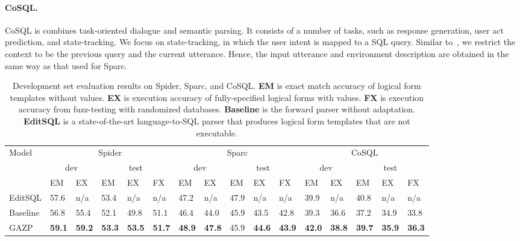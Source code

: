 \documentclass[11pt,a4paper]{article}
\begin{document}
\paragraph{CoSQL.}
CoSQL is combines task-oriented dialogue and semantic parsing.
It consists of a number of tasks, such as response generation, user act prediction, and state-tracking.
We focus on state-tracking, in which the user intent is mapped to a SQL query.
Similar to~\citet{zhang2019editing}, we restrict the context to be the previous query and the current utterance.
Hence, the input utterance and environment description are obtained in the same way as that used for Sparc.

\begin{table*}[t]
\centering
\addtolength{\tabcolsep}{-1.7pt}
\begin{tabular}{@{}llllllllllllllll@{}}
\toprule
\multirow{3}{*}{Model} & \multicolumn{5}{c}{Spider}       & \multicolumn{5}{c}{Sparc}        & \multicolumn{5}{c}{CoSQL}        \\ \cmidrule(l){2-6} \cmidrule(l){7-11} \cmidrule(l){12-16}
 & \multicolumn{2}{c}{dev} & \multicolumn{3}{c}{test} & \multicolumn{2}{c}{dev} & \multicolumn{3}{c}{test} & \multicolumn{2}{c}{dev} & \multicolumn{3}{c}{test} \\  \cmidrule(l){2-3} \cmidrule(l){4-6} \cmidrule(l){7-8} \cmidrule(l){9-11} \cmidrule(l){12-13} \cmidrule(l){14-16}
                       & EM   & EX   & EM   & EX   & FX   & EM   & EX   & EM   & EX   & FX   & EM   & EX   & EM   & EX   & FX   \\ \midrule
EditSQL                & 57.6 & n/a  & 53.4 & n/a  & n/a  & 47.2 & n/a  & 47.9 & n/a  & n/a  & 39.9 & n/a  & 40.8 & n/a  & n/a  \\ \midrule
Baseline               & 56.8 & 55.4 & 52.1 & 49.8 & 51.1 & 46.4 & 44.0 & 45.9 & 43.5 & 42.8 & 39.3 & 36.6 & 37.2 & 34.9 & 33.8 \\
GAZP                   & \textbf{59.1} & \textbf{59.2} & \textbf{53.3} & \textbf{53.5} & \textbf{51.7} & \textbf{48.9} & \textbf{47.8} & 45.9 & \textbf{44.6} & \textbf{43.9} & \textbf{42.0} & \textbf{38.8} & \textbf{39.7} & \textbf{35.9} & \textbf{36.3} \\ \bottomrule
\end{tabular}
\caption{
Development set evaluation results on Spider, Sparc, and CoSQL.
\textbf{EM} is exact match accuracy of logical form templates without values.
\textbf{EX} is execution accuracy of fully-specified logical forms with values.
\textbf{FX} is execution accuracy from fuzz-testing with randomized databases.
\textbf{Baseline} is the forward parser without adaptation.
\textbf{EditSQL} is a state-of-the-art language-to-SQL parser that produces logical form templates that are not executable.
}
\vspace{-0.1in}
\label{tab:results}
\end{table*}
\end{document}
